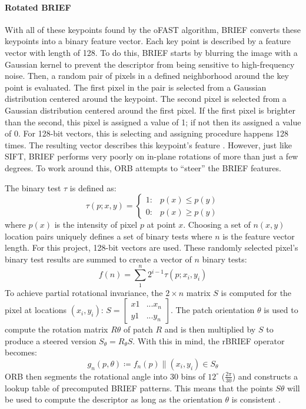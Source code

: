 \documentclass[stu,hidelinks,floatsintext,donotrepeattitle]{apa7}
\begin{document}
\paragraph{Rotated BRIEF}
With all of these keypoints found by the oFAST algorithm, BRIEF converts these keypoints into a binary feature vector. Each key point is described by a feature vector with length of 128. To do this, BRIEF starts by blurring the image with a Gaussian kernel to prevent the descriptor from being sensitive to high-frequency noise. Then, a random pair of pixels in a defined neighborhood around the key point is evaluated. The first pixel in the pair is selected from a Gaussian distribution centered around the keypoint. The second pixel is selected from a Gaussian distribution centered around the first pixel. If the first pixel is brighter than the second, this pixel is assigned a value of 1; if not then its assigned a value of 0. For 128-bit vectors, this is selecting and assigning procedure happens 128 times. The resulting vector describes this keypoint's feature \parencite{brief}. However, just like SIFT, BRIEF performs very poorly on in-plane rotations of more than just a few degrees. To work around this, ORB attempts to ``steer'' the BRIEF features.\par
The binary test $\tau$ is defined as:
\begin{equation}
  \tau(p;x,y) =
  \begin{cases}
    1: & \text{$p(x)\le p(y)$}\\
    0: & \text{$p(x)\geq p(y)$}
  \end{cases}
\end{equation}
where $p(x)$ is the intensity of pixel $p$ at point $x$. Choosing a set of $n(x,y)$ location pairs uniquely defines a set of binary tests where $n$ is the feature vector length. For this project, 128-bit vectors are used. These randomly selected pixel's binary test results are summed to create a vector of $n$ binary tests:
\begin{equation}
  f(n)=\sum_{1}^{n} 2^{i-1}\tau(p;x_i,y_i)
\end{equation}
To achieve partial rotational invariance, the $2 \times n$ matrix $S$ is computed for the pixel at locations $(x_i, y_i)$:
$ S =
\begin{bmatrix}
  x1 & ...x_n\\
  y1 & ...y_n
\end{bmatrix}$.
The patch orientation $\theta$ is used to compute the rotation matrix $R\theta$ of patch $R$ and is then multiplied by $S$ to produce a steered version $S_\theta=R_\theta S$. With this in mind, the rBRIEF operator becomes:
\begin{equation}
  g_n(p,\theta)\coloneqq f_n(p)\|(x_i,y_i)\in S_\theta 
\end{equation}
ORB then segments the rotational angle into 30 bins of $12^\circ$ ($\frac{2\pi}{30}$) and constructs a lookup table of precomputed BRIEF patterns. This means that the points $S\theta$ will be used to compute the descriptor as long as the orientation $\theta$ is consistent \parencite{orb}.
\end{document}
